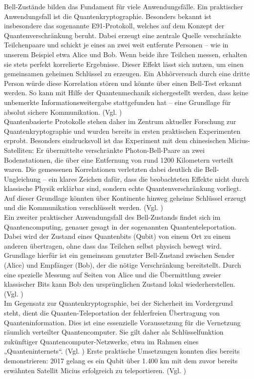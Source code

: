 Bell-Zustände bilden das Fundament für viele Anwendungsfälle. Ein praktischer Anwendungsfall ist die Quantenkryptographie. Besonders bekannt ist insbesondere das sogenannte E91-Protokoll, welches auf dem Konzept der Quantenverschränkung beruht. Dabei erzeugt eine zentrale Quelle verschränkte Teilchenpaare und schickt je eines an zwei weit entfernte Personen – wie in unserem Beispiel etwa Alice und Bob. Wenn beide ihre Teilchen messen, erhalten sie stets perfekt korrelierte Ergebnisse. Dieser Effekt lässt sich nutzen, um einen gemeinsamen geheimen Schlüssel zu erzeugen. Ein Abhörversuch durch eine dritte Person würde diese Korrelation stören und könnte über einen Bell-Test erkannt werden. So kann mit Hilfe der Quantenmechanik sichergestellt werden, dass keine unbemerkte Informationsweitergabe stattgefunden hat – eine Grundlage für absolut sichere Kommunikation. (Vgl. \cite[S. 3841 f.]{kumar_state---art_2021})
\\


Quantenbasierte Protokolle stehen daher im Zentrum aktueller Forschung zur Quantenkryptographie und wurden bereits in ersten praktischen Experimenten erprobt. Besonders eindrucksvoll ist das Experiment mit dem chinesischen Micius-Satelliten: Er übermittelte verschränkte Photon-Bell-Paare an zwei Bodenstationen, die über eine Entfernung von rund 1200 Kilometern verteilt waren. Die gemessenen Korrelationen verletzten dabei deutlich die Bell-Ungleichung – ein klares Zeichen dafür, dass die beobachteten Effekte nicht durch klassische Physik erklärbar sind, sondern echte Quantenverschränkung vorliegt. Auf dieser Grundlage könnten über Kontinente hinweg geheime Schlüssel erzeugt und die Kommunikation verschlüsselt werden. (Vgl. \cite{ivezic_entanglement_2022})
\\


Ein zweiter praktischer Anwendungsfall des Bell-Zustands findet sich im Quantencomputing, genauer gesagt in der sogenannten Quantenteleportation. Dabei wird der Zustand eines Quantenbits (Qubit) von einem Ort zu einem anderen übertragen, ohne dass das Teilchen selbst physisch bewegt wird. Grundlage hierfür ist ein gemeinsam genutzter Bell-Zustand zwischen Sender (Alice) und Empfänger (Bob), der die nötige Verschränkung bereitstellt. Durch eine spezielle Messung auf Seiten von Alice und die Übermittlung zweier klassischer Bits kann Bob den ursprünglichen Zustand lokal wiederherstellen. (Vgl. \cite{bennett_teleporting_1993})
\\


Im Gegensatz zur Quantenkryptographie, bei der Sicherheit im Vordergrund steht, dient die Quanten-Teleportation der fehlerfreien Übertragung von Quanteninformation. Dies ist eine essenzielle Voraussetzung für die Vernetzung räumlich verteilter Quantencomputer. Sie gilt daher als Schlüsselfunktion zukünftiger Quantencomputer-Netzwerke, etwa im Rahmen eines „Quanteninternets“. (Vgl. \cite{ivezic_entanglement_2022}) Erste praktische Umsetzungen konnten dies bereits demonstrieren: 2017 gelang es ein Qubit über 1.400 km mit dem zuvor bereits erwähnten Satellit Micius erfolgreich zu teleportieren. (Vgl. \cite{ren_ground--satellite_2017})



